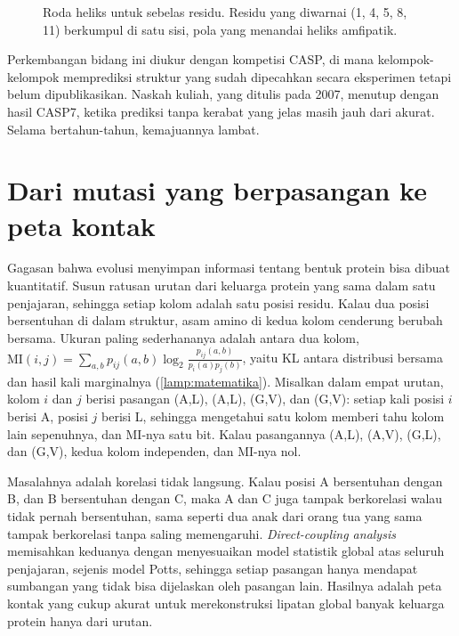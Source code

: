 \begin{figure}[ht]
\centering
{}
\caption{Roda heliks untuk sebelas residu. Residu yang diwarnai (1, 4, 5, 8, 11) berkumpul di satu sisi, pola yang
menandai heliks amfipatik.}
\label{fig:roda}
\end{figure}

Perkembangan bidang ini diukur dengan kompetisi CASP, di mana kelompok-kelompok memprediksi struktur yang sudah dipecahkan secara
eksperimen tetapi belum dipublikasikan. Naskah kuliah, yang ditulis pada 2007, menutup dengan hasil CASP7, ketika prediksi tanpa
kerabat yang jelas masih jauh dari akurat. Selama bertahun-tahun, kemajuannya lambat.

\section{Dari mutasi yang berpasangan ke peta kontak}

Gagasan bahwa evolusi menyimpan informasi tentang bentuk protein bisa dibuat kuantitatif. Susun ratusan urutan dari keluarga protein
yang sama dalam satu penjajaran, sehingga setiap kolom adalah satu posisi residu. Kalau dua posisi bersentuhan di dalam struktur,
asam amino di kedua kolom cenderung berubah bersama. Ukuran paling sederhananya adalah  antara dua kolom,
$\mathrm{MI}(i,j)=\sum_{a,b}p_{ij}(a,b)\log_2\frac{p_{ij}(a,b)}{p_i(a)p_j(b)}$, yaitu KL antara distribusi bersama dan hasil kali
marginalnya (\cref{lamp:matematika}). Misalkan dalam empat urutan, kolom $i$ dan $j$ berisi pasangan (A,L), (A,L), (G,V), dan (G,V):
setiap kali posisi $i$ berisi A, posisi $j$ berisi L, sehingga mengetahui satu kolom memberi tahu kolom lain sepenuhnya, dan MI-nya satu
bit. Kalau pasangannya (A,L), (A,V), (G,L), dan (G,V), kedua kolom independen, dan MI-nya nol.

Masalahnya adalah korelasi tidak langsung. Kalau posisi A bersentuhan dengan B, dan B bersentuhan dengan C, maka A dan C juga tampak
berkorelasi walau tidak pernah bersentuhan, sama seperti dua anak dari orang tua yang sama tampak berkorelasi tanpa saling memengaruhi.
\emph{Direct-coupling analysis} \citep{morcos2011} memisahkan keduanya dengan menyesuaikan model statistik global atas seluruh penjajaran,
sejenis model Potts, sehingga setiap pasangan hanya mendapat sumbangan yang tidak bisa dijelaskan oleh pasangan lain. Hasilnya adalah
peta kontak yang cukup akurat untuk merekonstruksi lipatan global banyak keluarga protein hanya dari urutan.

